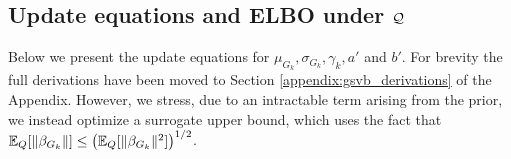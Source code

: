 \subsection{Update equations and ELBO under $\mathcal{Q}$}

Below we present the update equations for $\mu_{G_k}, \sigma_{G_k}, \gamma_k, a'$ and $b'$. For brevity the full derivations have been moved to Section \ref{appendix:gsvb_derivations} of the Appendix. However, we stress, due to an intractable term arising from the prior, we instead optimize a surrogate upper bound, which uses the fact that $\mathbb{E}_Q [ \| \beta_{G_k} \| ] \leq \left( \mathbb{E}_Q [ \| \beta_{G_k} \|^2 ] \right)^{1/2}$.

